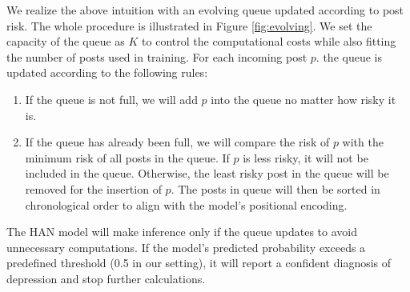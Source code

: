 We realize the above intuition with an evolving queue updated according to post risk. The whole procedure is illustrated in Figure \ref{fig:evolving}. We set the capacity of the queue as $K$ to control the computational costs while also fitting the number of posts used in training. For each incoming post $p$. the queue is updated according to the following rules: 

\begin{enumerate}
    \item If the queue is not full, we will add $p$ into the queue no matter how risky it is.
    \item If the queue has already been full, we will compare the risk of $p$ with the minimum risk of all posts in the queue. If $p$ is less risky, it will not be included in the queue. Otherwise, the least risky post in the queue will be removed for the insertion of $p$. The posts in queue will then be sorted in chronological order to align with the model's positional encoding.
\end{enumerate}

The HAN model will make inference only if the queue updates to avoid unnecessary computations. If the model's predicted probability exceeds a predefined threshold (0.5 in our setting), it will report a confident diagnosis of depression and stop further calculations.